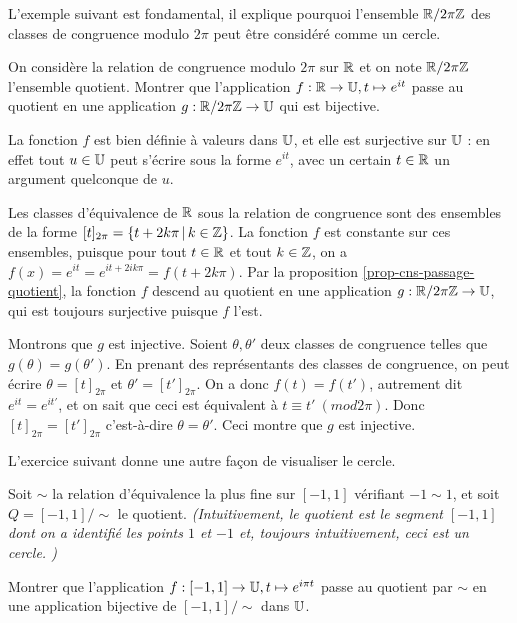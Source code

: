 L'exemple suivant est fondamental, il explique pourquoi l'ensemble $\mathbb{R}/2\pi\mathbb{Z}$ des classes de congruence modulo $2\pi$ peut être considéré comme un cercle.

\begin{exemple}
On considère la relation de congruence modulo $2\pi$ sur $\mathbb{R}$ et on note $\mathbb{R}/2\pi\mathbb{Z}$ l'ensemble quotient.
Montrer que l'application $f : \mathbb{R}\to \mathbb{U}, t\mapsto e^{it}$ passe au quotient en une application $g : \mathbb{R}/2\pi\mathbb{Z}\to \mathbb{U}$ qui est bijective.
\end{exemple}
\begin{red}
La fonction $f$ est bien définie à valeurs dans $\mathbb{U}$, et elle est surjective sur $\mathbb{U}$ : en effet tout $u\in \mathbb{U}$ peut s'écrire sous la forme $e^{it}$, avec un certain $t\in\mathbb{R}$ un argument quelconque de $u$.

Les classes d'équivalence de $\mathbb{R}$ sous la relation de congruence sont des ensembles de la forme $[t]_{2\pi} = \ensemble{t+2k\pi}{k\in \Z}$. La fonction $f$ est constante sur ces ensembles, puisque pour tout $t\in \mathbb{R}$ et tout $k\in \mathbb{Z}$, on a $f(x)=e^{it} = e^{it+2ik\pi} = f(t+2k\pi)$. Par la proposition \ref{prop-cns-passage-quotient}, la fonction $f$ descend au quotient en une application $g : \mathbb{R}/2\pi\mathbb{Z}\to \mathbb{U}$, qui est toujours surjective puisque $f$ l'est.

Montrons que $g$ est injective. Soient $\theta, \theta'$ deux classes de congruence telles que $g(\theta)=g(\theta')$. En prenant des représentants des classes de congruence, on peut écrire $\theta=[t]_{2\pi}$ et $\theta'=[t']_{2\pi}$. On a donc $f(t)=f(t')$, autrement dit $e^{it}=e^{it'}$, et on sait que ceci est équivalent à $t\equiv t'\:(mod 2\pi)$. Donc $[t]_{2\pi}=[t']_{2\pi}$ c'est-à-dire $\theta=\theta'$. Ceci montre que $g$ est injective.
\end{red}

L'exercice suivant donne une autre façon de visualiser le cercle.

\begin{exercice}
Soit $\sim$ la relation d'équivalence la plus fine sur $[-1,1]$ vérifiant $-1 \sim 1$, et soit $Q = [-1,1]/\sim$ le quotient. \emph{(Intuitivement, le quotient est le segment $[-1,1]$ dont on a identifié les points $1$ et $-1$ et, toujours intuitivement, ceci est un cercle. )}


Montrer que l'application $f : [-1,1] \to \mathbb{U}, t\mapsto e^{i\pi t}$ passe au quotient par $\sim$ en une application bijective de $[-1,1]/\sim$ dans $\mathbb{U}$.
\end{exercice}

